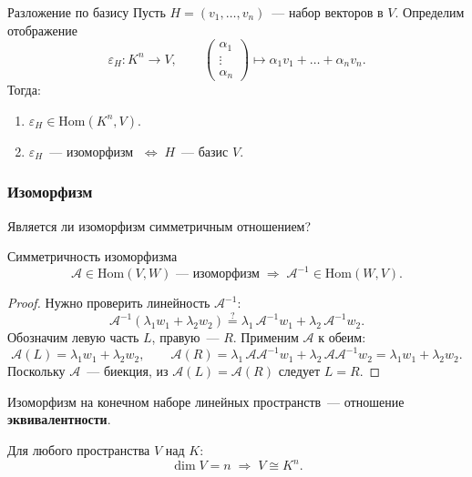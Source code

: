 \begin{Proposition}{Разложение по базису}{}
	Пусть $H = (v_1, \ldots, v_n)$~--- набор векторов в $V$. Определим отображение
	\[
	\varepsilon_H \colon K^n \longrightarrow V,
	\qquad
	\begin{pmatrix} \alpha_1 \\ \vdots \\ \alpha_n \end{pmatrix}
	\longmapsto \alpha_1 v_1 + \ldots + \alpha_n v_n.
	\]
	Тогда:
	\begin{enumerate}\setlength{\itemsep}{7pt}
		\item $\varepsilon_H \in \mathrm{Hom}(K^n, V)$.
		\item $\varepsilon_H$~--- изоморфизм $\;\Leftrightarrow\; H$~--- базис $V$.
	\end{enumerate}
\end{Proposition}

\subsubsection*{Изоморфизм}

Является ли изоморфизм симметричным отношением?

\begin{Proposition}{Симметричность изоморфизма}{}
	\[
	\mathcal{A} \in \mathrm{Hom}(V, W) \text{ --- изоморфизм}
	\;\Longrightarrow\;
	\mathcal{A}^{-1} \in \mathrm{Hom}(W, V).
	\]
\end{Proposition}

\begin{proof}
	Нужно проверить линейность $\mathcal{A}^{-1}$:
	\[
	\mathcal{A}^{-1}(\lambda_1 w_1 + \lambda_2 w_2) \overset{?}{=} \lambda_1\,\mathcal{A}^{-1}w_1 + \lambda_2\,\mathcal{A}^{-1}w_2.
	\]
	Обозначим левую часть $L$, правую~--- $R$. Применим $\mathcal{A}$ к обеим:
	\[
	\mathcal{A}(L) = \lambda_1 w_1 + \lambda_2 w_2,
	\qquad
	\mathcal{A}(R) = \lambda_1\,\mathcal{A}\mathcal{A}^{-1}w_1 + \lambda_2\,\mathcal{A}\mathcal{A}^{-1}w_2 = \lambda_1 w_1 + \lambda_2 w_2.
	\]
	Поскольку $\mathcal{A}$~--- биекция, из $\mathcal{A}(L) = \mathcal{A}(R)$ следует $L = R$.
\end{proof}

\begin{remark}
	Изоморфизм на конечном наборе линейных пространств~--- отношение \textbf{эквивалентности}.
\end{remark}

\begin{Corollary}{}{}
	Для любого пространства $V$ над $K$:
	\[
	\dim V = n \;\Rightarrow\; V \cong K^n.
	\]
\end{Corollary}

